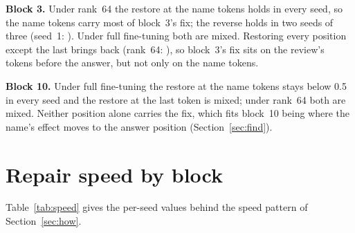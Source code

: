 \textbf{Block 3.} Under rank~64 the restore at the name tokens holds in every seed, so the name tokens carry most of
block~3's fix; the reverse holds in two seeds of three (seed~1: \fourBReverseNameBThreeLoraRSixtyFoursOne). Under full
fine-tuning both are mixed. Restoring every position except the last brings back \fourBRestoreNotlastBThreeFullFTRange{}
(rank~64: \fourBRestoreNotlastBThreeLoraRSixtyFourRange), so block~3's fix sits on the review's tokens before the
answer, but not only on the name tokens.

\textbf{Block 10.} Under full fine-tuning the restore at the name tokens stays below 0.5 in every seed and the restore at
the last token is mixed; under rank~64 both are mixed. Neither position alone carries the fix, which fits block~10
being where the name's effect moves to the answer position (Section~\ref{sec:find}).

\section{Repair speed by block}
\label{app:budget}
Table~\ref{tab:speed} gives the per-seed values behind the speed pattern of Section~\ref{sec:how}.

